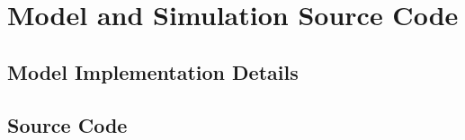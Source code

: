 \chapter{Model and Simulation Source Code}

\section{Model Implementation Details}
\section{Source Code}